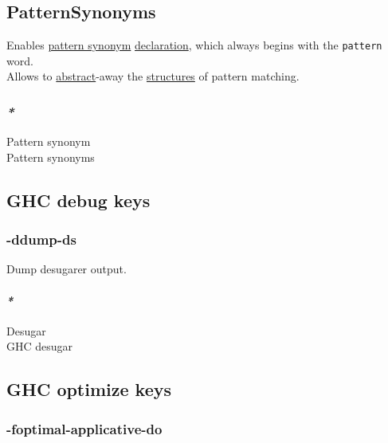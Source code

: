 \documentclass[11pt]{article}
\begin{document}
\subsection{\label{orgb220272}PatternSynonyms}
\label{sec:orga3ca620}
Enables \hyperref[org2b445bc]{pattern synonym} \hyperref[org56ef1b9]{declaration}, which always begins with the \texttt{pattern} word.\\
Allows to \hyperref[org606d002]{abstract}-away the \hyperref[org51d1eff]{structures} of pattern matching.\\

\subsubsection{\emph{*}}
\label{sec:org557e1e4}

\label{org2b445bc}Pattern synonym\\
\label{org44afbae}Pattern synonyms\\

\subsection{\label{org02b731a}GHC debug keys}
\label{sec:org643b52d}

\subsubsection{\label{org92ba825}-ddump-ds}
\label{sec:orgbe15bb3}

Dump desugarer output.\\

\paragraph{\emph{*}}
\label{sec:org53478f9}

\label{org11f43b0}Desugar\\
\label{org0b705a3}GHC desugar\\

\subsection{\label{org2c356a0}GHC optimize keys}
\label{sec:org58b753a}

\subsubsection{\label{orgcca3ef4}-foptimal-applicative-do}
\label{sec:orgfdd77c2}
\end{document}
